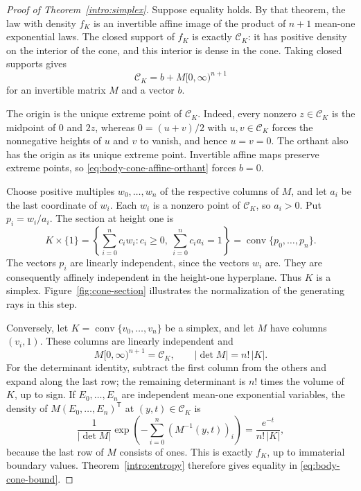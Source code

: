 \documentclass[11pt]{article}
\theoremstyle{definition}
\theoremstyle{remark}
\numberwithin{equation}{section}
\begin{document}
\begin{proof}[Proof of Theorem~\ref{intro:simplex}]
Suppose equality holds.  By that theorem, the law with density $f_K$
is an invertible affine image of the product of $n+1$ mean-one
exponential laws.  The closed support of $f_K$ is exactly
$\mathcal C_K$: it has positive density on the interior of the cone,
and this interior is dense in the cone.  Taking closed supports gives
\begin{equation}\label{eq:body-cone-affine-orthant}
  \mathcal C_K=b+M[0,\infty)^{n+1}
\end{equation}
for an invertible matrix $M$ and a vector $b$.

The origin is the unique extreme point of $\mathcal C_K$.  Indeed,
every nonzero $z\in\mathcal C_K$ is the midpoint of $0$ and $2z$,
whereas $0=(u+v)/2$ with $u,v\in\mathcal C_K$ forces the
nonnegative heights of $u$ and $v$ to vanish, and hence $u=v=0$.
The orthant also has the origin as its unique extreme point.
Invertible affine maps preserve extreme points, so
\eqref{eq:body-cone-affine-orthant} forces $b=0$.

Choose positive multiples $w_0,\ldots,w_n$ of the respective columns
of $M$, and let $a_i$ be the last coordinate of $w_i$.  Each $w_i$ is a nonzero point of
$\mathcal C_K$, so $a_i>0$.  Put $p_i=w_i/a_i$.  The section at
height one is
\begin{equation}\label{eq:body-cone-section}
  K\times\{1\}
  =\left\{\sum_{i=0}^n c_iw_i:
      c_i\geq0,\ \sum_{i=0}^n c_i a_i=1\right\}
  =\operatorname{conv}\{p_0,\ldots,p_n\}.
\end{equation}
The vectors $p_i$ are linearly independent, since the vectors $w_i$
are.  They are consequently affinely independent in the height-one
hyperplane.  Thus $K$ is a simplex.  Figure~\ref{fig:cone-section}
illustrates the normalization of the generating rays in this step.

Conversely, let $K=\operatorname{conv}\{v_0,\ldots,v_n\}$ be a
simplex, and let $M$ have columns $(v_i,1)$.  These columns are
linearly independent and
\[
  M[0,\infty)^{n+1}=\mathcal C_K,
  \qquad |\det M|=n!\,|K|.
\]
For the determinant identity, subtract the first column from the
others and expand along the last row; the remaining determinant is
$n!$ times the volume of $K$, up to sign.  If $E_0,\ldots,E_n$ are
independent mean-one exponential variables, the density of
$M(E_0,\ldots,E_n)^{\mathsf T}$ at $(y,t)\in\mathcal C_K$ is
\[
  \frac{1}{|\det M|}\exp\left(-\sum_{i=0}^n
    (M^{-1}(y,t))_i\right)
  =\frac{e^{-t}}{n!\,|K|},
\]
because the last row of $M$ consists of ones.  This is exactly
$f_K$, up to immaterial boundary values.  Theorem~\ref{intro:entropy}
therefore gives equality in \eqref{eq:body-cone-bound}.
\end{proof}
\end{document}
